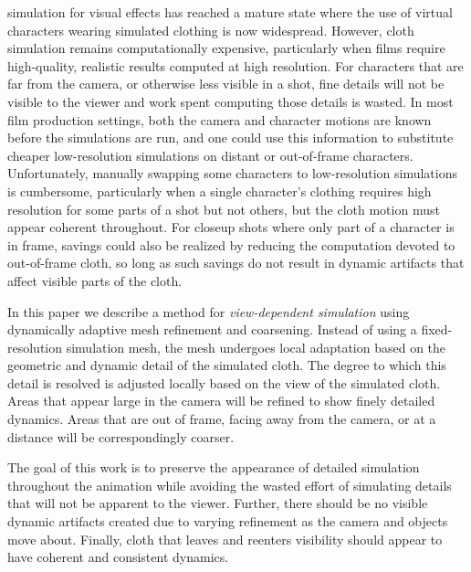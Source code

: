 \documentclass[10pt,journal,compsoc,twoside]{TexInputs/IEEEtran}
\begin{document}




 simulation for visual effects has reached a mature state where
the use of virtual characters wearing simulated clothing is now
widespread.  However, cloth simulation remains computationally
expensive, particularly when films require high-quality, realistic
results computed at high resolution.  For characters that are far from
the camera, or otherwise less visible in a shot, fine details
will not be visible to the viewer and work spent computing those
details is wasted.  In most film production settings, both the camera
and character motions are known before the simulations are run, and one
could use this information to substitute cheaper low-resolution
simulations on distant or out-of-frame characters.  Unfortunately,
manually swapping some characters to low-resolution simulations is
cumbersome, particularly when a single character's clothing requires
high resolution for some parts of a shot but not others, but the cloth
motion must appear coherent throughout.  For closeup shots where only
part of a character is in frame, savings could also be realized by reducing
the computation devoted to out-of-frame cloth, so long as such savings
do not result in dynamic artifacts that affect visible parts of the
cloth.

In this paper we describe a method for \textit{view-dependent simulation} using
dynamically adaptive mesh refinement and coarsening.  Instead of using
a fixed-resolution simulation mesh, the mesh undergoes local
adaptation based on the geometric and dynamic detail of the simulated
cloth. The degree to which this detail is resolved is adjusted locally
based on the view of the simulated cloth.  Areas that appear large
in the camera will be refined to show finely detailed dynamics.  Areas
that are out of frame, facing away from the camera, or at a distance
will be correspondingly coarser.

The goal of this work is to preserve the appearance of detailed
simulation throughout the animation while avoiding the wasted effort
of simulating details that will not be apparent to the viewer.
Further, there should be no visible dynamic artifacts created due to
varying refinement as the camera and objects move about.  Finally,
cloth that leaves and reenters visibility should appear to have
coherent and consistent dynamics.
\end{document}
